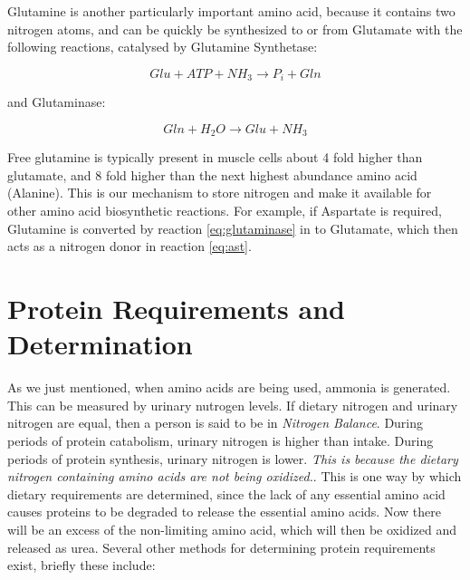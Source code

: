 \documentclass{tufte-handout}
\begin{document}
  Glutamine is another particularly important amino acid, because it contains two nitrogen atoms, and can be quickly be synthesized to or from Glutamate with the following reactions, catalysed by Glutamine Synthetase:

\begin{equation}
Glu + ATP +  NH_3 \rightarrow  P_i + Gln
\end{equation}

and Glutaminase:

\begin{equation}\label{eq:glutaminase} 
Gln + H_2O \rightarrow Glu + NH_3
\end{equation}

Free glutamine is typically present in muscle cells about 4 fold higher than glutamate, and 8 fold higher than the next highest abundance amino acid (Alanine).  This is our mechanism to store nitrogen and make it available for other amino acid biosynthetic reactions.  For example, if Aspartate is required, Glutamine is converted by reaction \ref{eq:glutaminase} in to Glutamate, which then acts as a nitrogen donor in reaction \ref{eq:ast}.

\section{Protein Requirements and Determination}
As we just mentioned, when amino acids are being used, ammonia is generated. This can be measured by urinary nutrogen levels.  If dietary nitrogen and urinary nitrogen are equal, then a person is said to be in \emph{Nitrogen Balance}.  During periods of protein catabolism, urinary nitrogen is higher than intake.  During periods of protein synthesis, urinary nitrogen is lower.  \emph{This is because the dietary nitrogen containing amino acids are not being oxidized.}.  This is one way by which dietary requirements are determined, since the lack of any essential amino acid causes proteins to be degraded to release the essential amino acids.  Now there will be an excess of the non-limiting amino acid, which will then be oxidized and released as urea.  Several other methods for determining protein requirements exist, briefly these include:
\end{document}

